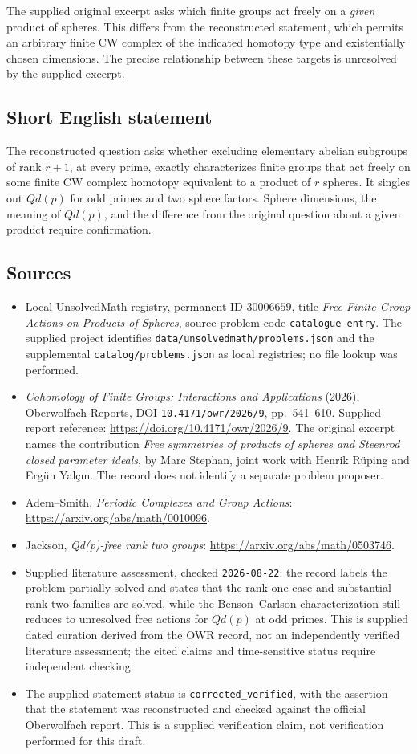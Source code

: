 \documentclass[11pt]{article}
\begin{document}
The supplied original excerpt asks which finite groups act freely on a \emph{given} product of spheres. This differs from the reconstructed statement, which permits an arbitrary finite CW complex of the indicated homotopy type and existentially chosen dimensions. The precise relationship between these targets is unresolved by the supplied excerpt.
\subsection{Short English statement}
The reconstructed question asks whether excluding elementary abelian subgroups of rank \(r+1\), at every prime, exactly characterizes finite groups that act freely on some finite CW complex homotopy equivalent to a product of \(r\) spheres. It singles out \(Qd(p)\) for odd primes and two sphere factors. Sphere dimensions, the meaning of \(Qd(p)\), and the difference from the original question about a given product require confirmation.
\subsection{Sources}
\begin{itemize}
\item Local UnsolvedMath registry, permanent ID \(30006659\), title \emph{Free Finite-Group Actions on Products of Spheres}, source problem code \texttt{catalogue entry}. The supplied project identifies \texttt{data/unsolvedmath/problems.json} and the supplemental \texttt{catalog/problems.json} as local registries; no file lookup was performed.
\item \emph{Cohomology of Finite Groups: Interactions and Applications} (2026), Oberwolfach Reports, DOI \texttt{10.4171/owr/2026/9}, pp.\ 541--610. Supplied report reference: \url{https://doi.org/10.4171/owr/2026/9}. The original excerpt names the contribution \emph{Free symmetries of products of spheres and Steenrod closed parameter ideals}, by Marc Stephan, joint work with Henrik R\"uping and Erg\"un Yal\c{c}{\i}n. The record does not identify a separate problem proposer.
\item Adem--Smith, \emph{Periodic Complexes and Group Actions}: \url{https://arxiv.org/abs/math/0010096}.
\item Jackson, \emph{Qd(p)-free rank two groups}: \url{https://arxiv.org/abs/math/0503746}.
\item Supplied literature assessment, checked \texttt{2026-08-22}: the record labels the problem partially solved and states that the rank-one case and substantial rank-two families are solved, while the Benson--Carlson characterization still reduces to unresolved free actions for \(Qd(p)\) at odd primes. This is supplied dated curation derived from the OWR record, not an independently verified literature assessment; the cited claims and time-sensitive status require independent checking.
\item The supplied statement status is \texttt{corrected\_verified}, with the assertion that the statement was reconstructed and checked against the official Oberwolfach report. This is a supplied verification claim, not verification performed for this draft.
\end{itemize}
\end{document}
